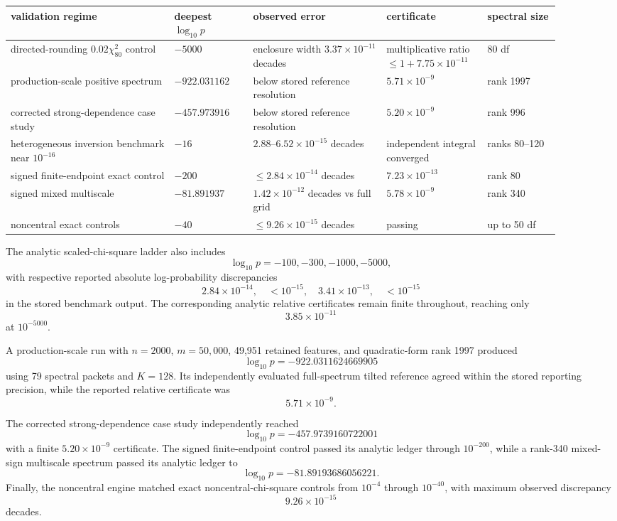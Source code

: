 \documentclass[11pt]{article}
\theoremstyle{definition}
\theoremstyle{remark}
\begin{document}
\begin{center}
\small
\begin{tabular}{@{}p{0.27\linewidth}p{0.13\linewidth}p{0.22\linewidth}p{0.16\linewidth}p{0.12\linewidth}@{}}
\toprule
validation regime & deepest $\log_{10}p$ & observed error & certificate & spectral size\\
\midrule
directed-rounding $0.02\chi^2_{80}$ control
& $-5000$ & enclosure width $3.37\times10^{-11}$ decades
& multiplicative ratio $\le 1+7.75\times10^{-11}$ & 80 df\\
production-scale positive spectrum
& $-922.031162$ & below stored reference resolution & $5.71\times10^{-9}$ & rank 1997\\
corrected strong-dependence case study
& $-457.973916$ & below stored reference resolution & $5.20\times10^{-9}$ & rank 996\\
heterogeneous inversion benchmark near $10^{-16}$
& $-16$ & $2.88$--$6.52\times10^{-15}$ decades & independent integral converged & ranks 80--120\\
signed finite-endpoint exact control
& $-200$ & $\le 2.84\times10^{-14}$ decades & $7.23\times10^{-13}$ & rank 80\\
signed mixed multiscale
& $-81.891937$ & $1.42\times10^{-12}$ decades vs full grid & $5.78\times10^{-9}$ & rank 340\\
noncentral exact controls
& $-40$ & $\le 9.26\times10^{-15}$ decades & passing & up to 50 df\\
\bottomrule
\end{tabular}
\end{center}

The analytic scaled-chi-square ladder also includes
\[
\log_{10}p=-100,-300,-1000,-5000,
\]
with respective reported absolute log-probability discrepancies
\[
2.84\times10^{-14},\quad
<10^{-15},\quad
3.41\times10^{-13},\quad
<10^{-15}
\]
in the stored benchmark output.  The corresponding analytic relative certificates
remain finite throughout, reaching only
\[
3.85\times10^{-11}
\]
at \(10^{-5000}\).

A production-scale run with \(n=2000\), \(m=50{,}000\), 49,951 retained
features, and quadratic-form rank 1997 produced
\[
\boxed{\log_{10}p=-922.0311624669905}
\]
using 79 spectral packets and \(K=128\).  Its independently evaluated
full-spectrum tilted reference agreed within the stored reporting precision, while the
reported relative certificate was
\[
5.71\times10^{-9}.
\]

The corrected strong-dependence case study independently reached
\[
\boxed{\log_{10}p=-457.9739160722001}
\]
with a finite \(5.20\times10^{-9}\) certificate.  The signed finite-endpoint
control passed its analytic ledger through \(10^{-200}\), while a rank-340 mixed-sign
multiscale spectrum passed its analytic ledger to
\[
\boxed{\log_{10}p=-81.89193686056221}.
\]
Finally, the noncentral engine matched exact noncentral-chi-square controls
from \(10^{-4}\) through \(10^{-40}\), with maximum observed discrepancy
\[
9.26\times10^{-15}
\]
decades.
\end{document}
